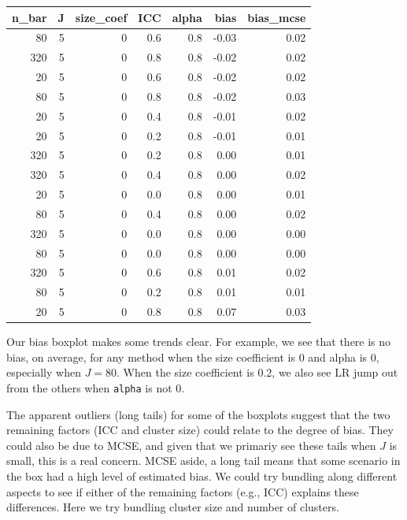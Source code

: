 \documentclass[
]{book}
\begin{document}
\begin{tabular}{r|r|r|r|r|r|r}
\hline
n\_bar & J & size\_coef & ICC & alpha & bias & bias\_mcse\\
\hline
80 & 5 & 0 & 0.6 & 0.8 & -0.03 & 0.02\\
\hline
320 & 5 & 0 & 0.8 & 0.8 & -0.02 & 0.02\\
\hline
20 & 5 & 0 & 0.6 & 0.8 & -0.02 & 0.02\\
\hline
80 & 5 & 0 & 0.8 & 0.8 & -0.02 & 0.03\\
\hline
20 & 5 & 0 & 0.4 & 0.8 & -0.01 & 0.02\\
\hline
20 & 5 & 0 & 0.2 & 0.8 & -0.01 & 0.01\\
\hline
320 & 5 & 0 & 0.2 & 0.8 & 0.00 & 0.01\\
\hline
320 & 5 & 0 & 0.4 & 0.8 & 0.00 & 0.02\\
\hline
20 & 5 & 0 & 0.0 & 0.8 & 0.00 & 0.01\\
\hline
80 & 5 & 0 & 0.4 & 0.8 & 0.00 & 0.02\\
\hline
320 & 5 & 0 & 0.0 & 0.8 & 0.00 & 0.00\\
\hline
80 & 5 & 0 & 0.0 & 0.8 & 0.00 & 0.00\\
\hline
320 & 5 & 0 & 0.6 & 0.8 & 0.01 & 0.02\\
\hline
80 & 5 & 0 & 0.2 & 0.8 & 0.01 & 0.01\\
\hline
20 & 5 & 0 & 0.8 & 0.8 & 0.07 & 0.03\\
\hline
\end{tabular}

Our bias boxplot makes some trends clear.
For example, we see that there is no bias, on average, for any method when the size coefficient is 0 and alpha is 0, especially when \(J = 80\).
When the size coefficient is 0.2, we also see LR jump out from the others when \texttt{alpha} is not 0.

The apparent outliers (long tails) for some of the boxplots suggest that the two remaining factors (ICC and cluster size) could relate to the degree of bias.
They could also be due to MCSE, and given that we primariy see these tails when \(J\) is small, this is a real concern.
MCSE aside, a long tail means that some scenario in the box had a high level of estimated bias.
We could try bundling along different aspects to see if either of the remaining factors (e.g., ICC) explains these differences.
Here we try bundling cluster size and number of clusters.
\end{document}
